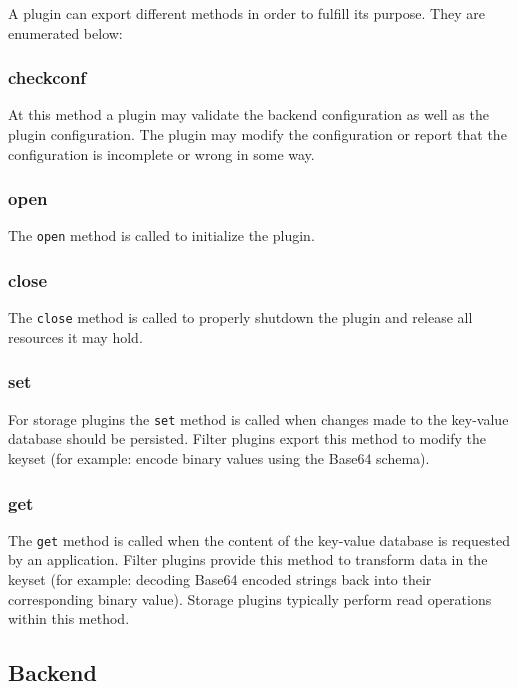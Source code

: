 A plugin can export different methods in order to fulfill its purpose.
They are enumerated below:

\subsubsection{checkconf}\label{checkconf}

At this method a plugin may validate the backend configuration as well as
the plugin configuration. The plugin may modify the configuration or
report that the configuration is incomplete or wrong in some way.

\subsubsection{open}\label{open}

The \texttt{open} method is called to initialize the plugin.

\subsubsection{close}\label{close}

The \texttt{close} method is called to properly shutdown the plugin and
release all resources it may hold.

\subsubsection{set}\label{set}

For storage plugins the \texttt{set} method is called when changes made to the key-value
database should be persisted.
Filter plugins export this method to modify the keyset (for example: encode binary values using the Base64 schema).

\subsubsection{get}\label{get}

The \texttt{get} method is called when the content of the key-value
database is requested by an application.
Filter plugins provide this method to transform data in the keyset (for example: decoding Base64 encoded strings back into their corresponding binary value).
Storage plugins typically perform read operations within this method.

\subsection{Backend}

